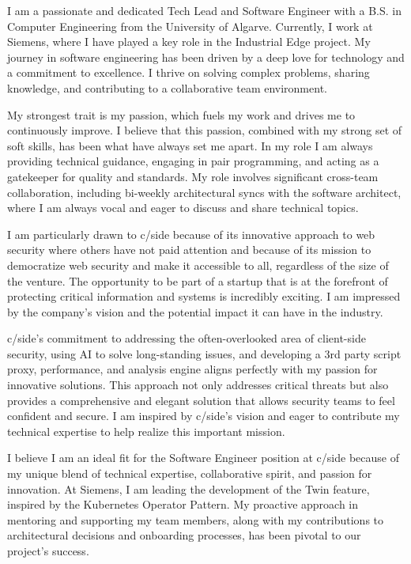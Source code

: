 \documentclass[11pt, a4paper]{awesome-cv}
\begin{document}
\begin{cvletter}

I am a passionate and dedicated Tech Lead and Software Engineer with a B.S. in Computer Engineering from the University of Algarve. Currently, I work at Siemens, where I have played a key role in the Industrial Edge project. My journey in software engineering has been driven by a deep love for technology and a commitment to excellence. I thrive on solving complex problems, sharing knowledge, and contributing to a collaborative team environment.

My strongest trait is my passion, which fuels my work and drives me to continuously improve. I believe that this passion, combined with my strong set of soft skills, has been what have always set me apart. In my role I am always providing technical guidance, engaging in pair programming, and acting as a gatekeeper for quality and standards. My role involves significant cross-team collaboration, including bi-weekly architectural syncs with the software architect, where I am always vocal and eager to discuss and share technical topics.

I am particularly drawn to c/side because of its innovative approach to web security where others have not paid attention and because of its mission to democratize web security and make it accessible to all, regardless of the size of the venture. The opportunity to be part of a startup that is at the forefront of protecting critical information and systems is incredibly exciting. I am impressed by the company's vision and the potential impact it can have in the industry.

c/side's commitment to addressing the often-overlooked area of client-side security, using AI to solve long-standing issues, and developing a 3rd party script proxy, performance, and analysis engine aligns perfectly with my passion for innovative solutions. This approach not only addresses critical threats but also provides a comprehensive and elegant solution that allows security teams to feel confident and secure. I am inspired by c/side's vision and eager to contribute my technical expertise to help realize this important mission.

I believe I am an ideal fit for the Software Engineer position at c/side because of my unique blend of technical expertise, collaborative spirit, and passion for innovation. At Siemens, I am leading the development of the Twin feature, inspired by the Kubernetes Operator Pattern. My proactive approach in mentoring and supporting my team members, along with my contributions to architectural decisions and onboarding processes, has been pivotal to our project's success.


\end{cvletter}
\end{document}
